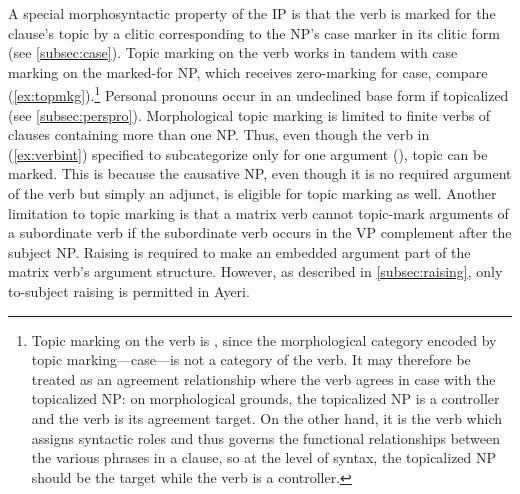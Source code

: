 A special morphosyntactic property of the IP is that the verb is marked for the
clause's topic by a clitic corresponding to the NP's case marker in its clitic
form (see \autoref{subsec:case}). Topic marking on the verb works in tandem
with case marking on the marked-for NP, which receives zero-marking
for case, compare (\ref{ex:topmkg}).\footnote{Topic marking on the verb is
, since the
morphological category encoded by topic marking---case---is not a category of
the verb. It may therefore be treated as an agreement relationship where
the verb agrees in case with the topicalized NP: on morphological
grounds, the topicalized NP is a controller and the verb is its agreement
target. On the other hand, it is the verb which assigns syntactic roles and
thus governs the functional relationships between the various phrases in a
clause, so at the level of syntax, the topicalized NP should be the target
while the verb is a controller.} Personal pronouns occur in an undeclined base
form if topicalized (see \autoref{subsec:perspro}). Morphological topic marking
is limited to finite verbs of clauses containing more than one NP. Thus, even
though the verb in (\ref{ex:verbint}) specified to subcategorize only for one argument
(\Aarg{}), topic can be marked. This is because the causative NP, even though
it is no required argument of the verb but simply an adjunct, is eligible for
topic marking as well. Another limitation to topic marking is that a matrix
verb cannot topic-mark arguments of a subordinate verb if the subordinate verb
occurs in the VP complement after the subject NP. Raising is required to make
an embedded argument part of the matrix verb's argument structure. However, as
described in \autoref{subsec:raising}, only to-subject raising is permitted in
Ayeri.

